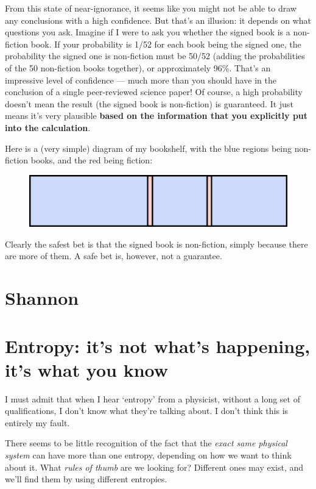 \documentclass[a4paper, 12pt]{article}
\begin{document}
From this state of near-ignorance, it seems like you might not be able to draw
any conclusions with a high confidence. But that's an illusion: it depends on
what questions you ask. Imagine if I were to ask you whether the signed book
is a non-fiction book. If your probability is 1/52 for each book being the
signed one, the probability the signed one is non-fiction must be
50/52 (adding the probabilities of the 50 non-fiction books together), 
or approximately 96\%. That's an impressive level of confidence --- much more than you should have in the conclusion of a single peer-reviewed science paper!
Of course, a high probability doesn't mean the result (the signed book is
non-fiction) is guaranteed. It just means it's very plausible {\bf based on the
information that you explicitly put into the calculation}.

Here is a (very simple) diagram of my bookshelf, with the blue regions
being non-fiction books, and the red being fiction:
\begin{figure}[ht!]
\centering
\includegraphics{bookshelf.png}
\end{figure}
Clearly the safest bet is that the signed book is non-fiction, simply because
there are more of them. A safe bet is, however, not a guarantee.

\section*{Shannon}


\section*{Entropy: it's not what's happening, it's what you know}



I must admit that when I hear `entropy' from a physicist, without a long
set of qualifications, I don't know what they're talking about.
I don't think this is entirely my fault.

There seems to be little recognition of the fact
that the {\em exact same physical system}
can have more than one entropy, depending on how we want to think about it.
What {\em rules of thumb} are we looking for? Different ones may exist, and
we'll find them by using different entropies.
\end{document}
